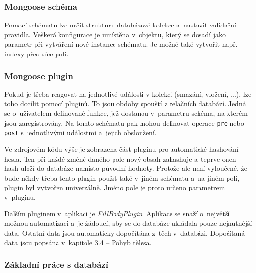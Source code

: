 \documentclass[a4paper,12pt]{article}
\def\code#1{\texttt{#1}}
\begin{document}


\subsubsection{Mongoose schéma}

Pomocí schématu lze určit strukturu databázové kolekce a~nastavit validační pravidla. Veškerá konfigurace je umístěna v~objektu, který se dosadí jako parametr při vytváření nové instance schématu. Je možné také vytvořit např. indexy přes více polí.~\cite{nodebook}



\subsubsection{Mongoose plugin}

Pokud je třeba reagovat na jednotlivé události v kolekci (smazání, vložení, ...), lze toho docílit pomocí pluginů. To jsou obdoby spouští z relačních databází. Jedná se o~uživatelem definované funkce, jež dostanou v~parametru schéma, na kterém jsou zaregistrovány. Na tomto schématu pak mohou definovat operace \code{pre} nebo \code{post} s~jednotlivými událostmi a~jejich obsloužení.~\cite{nodebook}



Ve zdrojovém kódu výše je zobrazena část pluginu pro automatické hashování hesla. Ten při každé změně daného pole nový obsah zahashuje a~teprve onen hash uloží do databáze namísto původní hodnoty. Protože ale není vyloučené, že bude někdy třeba tento plugin použít také v~jiném schématu a~na jiném poli, plugin byl vytvořen univerzálně. Jméno pole je proto určeno parametrem v~pluginu.

Dalším pluginem v~aplikaci je \textit{FillBodyPlugin}. Aplikace se snaží o~největší možnou automatizaci a~je žádoucí, aby se do databáze ukládala pouze nejnutnější data. Ostatní data jsou automaticky dopočítána z~těch v~databázi. Dopočítaná data jsou popsána v~kapitole 3.4 -- Pohyb tělesa.

\subsubsection{Základní práce s databází}
\end{document}
